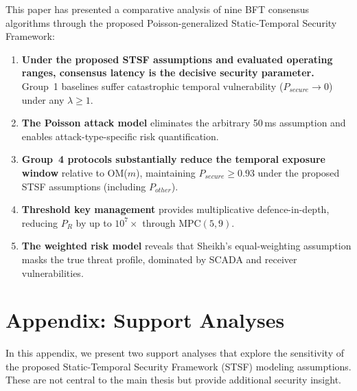 \documentclass[10pt,twocolumn,letterpaper]{article}
\begin{document}
This paper has presented a comparative analysis of nine BFT consensus algorithms through the proposed Poisson-generalized Static-Temporal Security Framework:

\begin{enumerate}[leftmargin=*]
    \item \textbf{Under the proposed STSF assumptions and evaluated operating ranges, consensus latency is the decisive security parameter.} Group~1 baselines suffer catastrophic temporal vulnerability ($P_{secure} \rightarrow 0$) under any $\lambda \geq 1$.

    \item \textbf{The Poisson attack model} eliminates the arbitrary 50\,ms assumption and enables attack-type-specific risk quantification.

    \item \textbf{Group~4 protocols substantially reduce the temporal exposure window} relative to OM($m$), maintaining $P_{secure} \geq 0.93$ under the proposed STSF assumptions (including $P_{other}$).

    \item \textbf{Threshold key management} provides multiplicative defence-in-depth, reducing $P_R$ by up to $10^7\times$ through MPC$(5,9)$.

    \item \textbf{The weighted risk model} reveals that Sheikh's equal-weighting assumption masks the true threat profile, dominated by SCADA and receiver vulnerabilities.
\end{enumerate}


\appendix
\section{Appendix: Support Analyses}
\label{sec:appendix}

In this appendix, we present two support analyses that explore the sensitivity of the proposed Static-Temporal Security Framework (STSF) modeling assumptions. These are not central to the main thesis but provide additional security insight.
\end{document}

